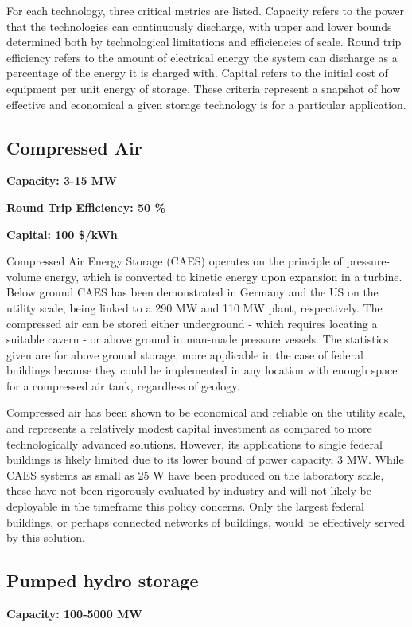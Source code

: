 For each technology, three critical metrics are listed. Capacity refers to the
power that the technologies can continuously discharge, with upper and lower
bounds determined both by technological limitations and efficiencies of scale.
Round trip efficiency refers to the amount of electrical energy the system can
discharge as a percentage of the energy it is charged with. Capital refers to
the initial cost of equipment per unit energy of storage. These criteria
represent a snapshot of how effective and economical a given storage technology
is for a particular application.

\subsection{Compressed Air}
\textbf{Capacity: 3-15 MW}

\noindent\textbf{Round Trip Efficiency: 50 \%}

\noindent\textbf{Capital: 100 \$/kWh}

Compressed Air Energy Storage (CAES) operates on the principle of
pressure-volume energy, which is converted to kinetic energy upon expansion in
a turbine. Below ground CAES has been demonstrated in Germany and the US on the
utility scale, being linked to a 290 MW and 110 MW plant, respectively. The
compressed air can be stored either underground - which requires locating a
suitable cavern - or above ground in man-made pressure vessels. The statistics
given are for above ground storage, more applicable in the case of federal
buildings because they could be implemented in any location with enough space
for a compressed air tank, regardless of geology.

Compressed air has been shown to be economical and reliable on the utility
scale, and represents a relatively modest capital investment as compared to
more technologically advanced solutions. However, its applications to single
federal buildings is likely limited due to its lower bound of power capacity, 3
MW. While CAES systems as small as 25 W have been produced on the laboratory
scale, these have not been rigorously evaluated by industry and will not likely
be deployable in the timeframe this policy concerns. Only the largest federal
buildings, or perhaps connected networks of buildings, would be effectively
served by this solution.

\subsection{Pumped hydro storage}
\textbf{Capacity: 100-5000 MW}

